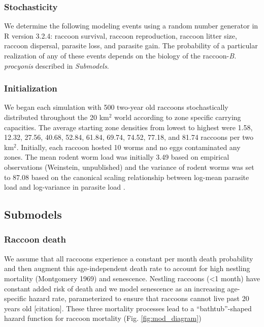 \documentclass[11pt]{article}
\begin{document}
\subsubsection{Stochasticity}

We determine the following modeling events using a random number generator in R version 3.2.4: raccoon survival, raccoon reproduction, raccoon litter size, raccoon dispersal, parasite loss, and parasite gain.  The probability of a particular realization of any of these events depends on the biology of the raccoon-\emph{B. procyonis} described in \emph{Submodels}.

\subsubsection{Initialization}

We began each simulation with 500 two-year old raccoons stochastically
distributed throughout the 20 km$^2$ world according to
zone specific carrying capacities. The average starting zone densities from lowest to highest were 1.58, 12.32, 27.56, 40.68, 52.84, 61.84, 69.74, 74.52, 77.18, and 81.74 raccoons per two km$^2$.
Initially, each raccoon hosted 10 worms and no eggs contaminated any
zones. The mean rodent worm load was initially 3.49 based on
empirical observations (Weinstein, unpublished) and the variance of rodent worms
was set to 87.08 based on the canonical scaling relationship between
log-mean parasite load and log-variance in parasite load \citep{Shaw1995}.

\subsection{Submodels}

\subsubsection{Raccoon death}

We assume that all raccoons experience a constant per month death
probability and then augment this age-independent death rate to account
for high nestling mortality (Montgomery 1969) and senescence. Nestling
raccoons (\textless{}1 month) have constant added risk of death and we
model senescence as an increasing age-specific hazard rate,
parameterized to ensure that raccoons cannot live past 20 years old [citation].
These three mortality processes lead to a ``bathtub''-shaped hazard
function for raccoon mortality (Fig. \ref{fig:mod_diagram})
\end{document}
